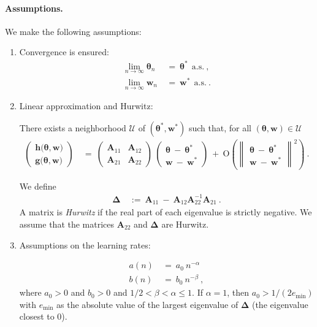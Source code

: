 \documentclass{article}
\newcommand\Bg{\bm{g}}
\newcommand\Bh{\bm{h}}
\newcommand\Bw{\bm{w}}
\newcommand\BA{\bm{A}}
\newcommand\Bth{\bm{\theta}}
\newcommand\BDe{\bm{\Delta}}
\newcommand{\rO}{\mathrm{O}} \newcommand{\rP}{\mathrm{P}}
\newcommand{\cU}{\mathcal{U}} \newcommand{\cV}{\mathcal{V}}
\renewcommand{\leq}{\leqslant}
\begin{document}
\paragraph{Assumptions.}
We make the following assumptions:
\begin{enumerate}[label=\textbf{(A\arabic*)}]
\item Convergence is ensured:
\begin{align}
\lim_{n \to \infty} \Bth_n \ &= \ \Bth^{*} \ \ \text{a.s.} \ , \\
\lim_{n \to \infty} \Bw_n \ &= \ \Bw^{*} \ \ \text{a.s.} \ .
\end{align}

\item Linear approximation and Hurwitz:

There exists a neighborhood $\cU$ of $(\Bth^{*},\Bw^{*})$ such that,
for all $(\Bth,\Bw)\in \cU$
\begin{align}
\begin{pmatrix}
\Bh\big(\Bth, \Bw\big) \\
\Bg\big(\Bth, \Bw\big)
\end{pmatrix}
\ &= \
\begin{pmatrix}
\BA_{11} & \BA_{12} \\
\BA_{21} & \BA_{22}
\end{pmatrix} \
\begin{pmatrix}
\Bth \ - \ \Bth^{*} \\
\Bw \ - \ \Bw^{*}
\end{pmatrix}
\ + \
\rO \left(
\begin{Vmatrix}
\Bth \ - \ \Bth^{*} \\
\Bw \ - \ \Bw^{*}
\end{Vmatrix}^2
\right) \ .
\end{align}

We define
\begin{align}
\BDe \ &:= \ \BA_{11} \ - \ \BA_{12} \BA_{22}^{-1} \BA_{21} \ .
\end{align}
A matrix is {\em Hurwitz} if the real part of each eigenvalue is strictly
negative.
We assume that the matrices $\BA_{22}$ and $\BDe$ are Hurwitz.

\item Assumptions on the learning rates:

\begin{align}
a(n) \ &= \ a_0 \ n^{-\alpha} \\
b(n) \ &= \ b_0 \ n^{-\beta} \ ,
\end{align}
where $a_0>0$ and $b_0>0$ and $1/2 < \beta < \alpha \leq 1$.
If $\alpha=1$, then $a_0>1/(2 e_{\mathrm{min}})$ with $e_{\mathrm{min}}$
as the absolute value of the largest eigenvalue of $\BDe$ (the
eigenvalue closest to 0).


\end{enumerate}
\end{document}
